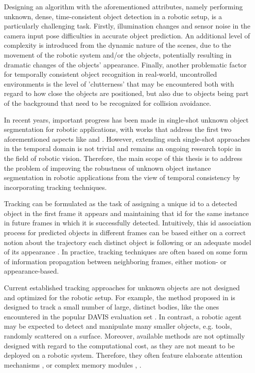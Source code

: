 Designing an algorithm with the aforementioned attributes, namely performing unknown, dense, time-consistent object detection in a robotic setup, is a particularly challenging task. 
Firstly, illumination changes and sensor noise in the camera input pose difficulties in accurate object prediction. 
An additional level of complexity is introduced from the dynamic nature of the scenes, due to the movement of the robotic system and/or the objects, potentially resulting in dramatic changes of the objects' appearance. 
Finally, another problematic factor for temporally consistent object recognition in real-world, uncontrolled environments is the level of 'clutterness' that may be encountered both with regard to how close the objects are positioned, but also due to objects being part of the background that need to be recognized for collision avoidance. \par

In recent years, important progress has been made in single-shot unknown object segmentation for robotic applications, with works that address the first two aforementioned aspects like \parencite{durner2021unknown} and \parencite{simnet}. 
However, extending such single-shot approaches in the temporal domain is not trivial and remains an ongoing research topic in the field of robotic vision.
Therefore, the main scope of this thesis is to address the problem of improving the robustness of unknown object instance segmentation in robotic applications from the view of temporal consistency by incorporating tracking techniques. \par

Tracking can be formulated as the task of assigning a unique id to a detected object in the first frame it appears and maintaining that id for the same instance in future frames in which it is successfully detected. Intuitively, this id association process for predicted objects in different frames can be based either on a correct notion about the trajectory each distinct object is following or an adequate model of its appearance \parencite{tracktor_2019_ICCV}. 
In practice, tracking techniques are often based on some form of information propagation between neighboring frames, either motion- or appearance-based. \par

Current established tracking approaches for unknown objects are not designed and optimized for the robotic setup. 
For example, the method proposed in \parencite{athar2022hodor} is designed to track a small number of large, distinct bodies, like the ones encountered in the popular DAVIS evaluation set \parencite{davis}. In contrast, a robotic agent may be expected to detect and manipulate many smaller objects, e.g. tools, randomly scattered on a surface.
Moreover, available methods are not optimally designed with regard to the computational cost, as they are not meant to be deployed on a robotic system. 
Therefore, they often feature elaborate attention mechanisms \parencite{athar2022hodor}, \parencite{savi} or complex memory modules \parencite{cheng2022xmem}, \parencite{yang2021aot}. \par

